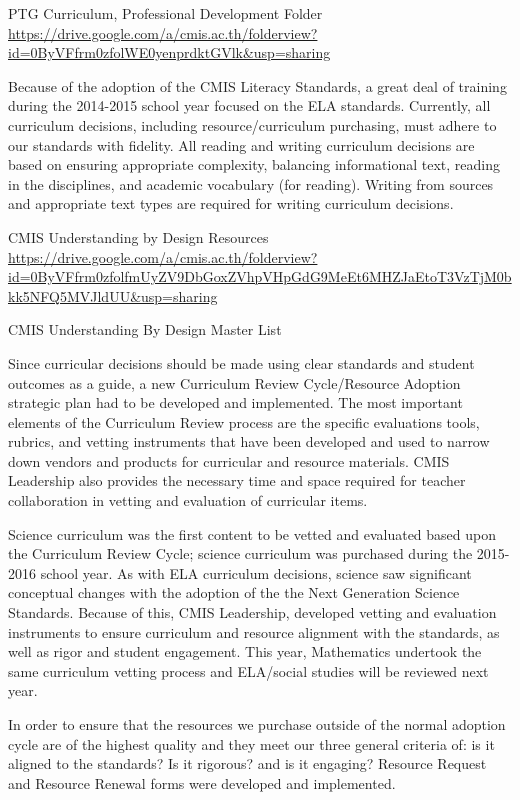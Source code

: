 \documentclass{report}
\begin{document}
\begin{evidence}
\item PTG Curriculum, Professional Development Folder \url{https://drive.google.com/a/cmis.ac.th/folderview?id=0ByVFfrm0zfolWE0yenprdktGVlk&usp=sharing}
\end{evidence}

\begin{findings}
Because of the adoption of the CMIS Literacy Standards, a great deal of training during the 2014-2015 school year focused on the ELA standards. Currently, all curriculum decisions, including resource/curriculum purchasing, must adhere to our standards with fidelity. All reading and writing curriculum decisions are based on ensuring appropriate complexity, balancing informational text, reading in the disciplines, and academic vocabulary (for reading). Writing from sources and appropriate text types are required for writing curriculum decisions. 
\end{findings}

\begin{evidence}
\item CMIS Understanding by Design Resources \url{https://drive.google.com/a/cmis.ac.th/folderview?id=0ByVFfrm0zfolfmUyZV9DbGoxZVhpVHpGdG9MeEt6MHZJaEtoT3VzTjM0bkk5NFQ5MVJldUU&usp=sharing}
\item CMIS Understanding By Design Master List
\end{evidence}

\begin{findings}

Since curricular decisions should be made using clear standards and student outcomes as a guide, a new Curriculum Review Cycle/Resource Adoption strategic plan had to be developed and implemented. The most important elements of the Curriculum Review process are the specific evaluations tools, rubrics, and vetting instruments that have been developed and used to narrow down vendors and products for curricular and resource materials. CMIS Leadership also provides the necessary time and space required for teacher collaboration in vetting and evaluation of curricular items. 

Science curriculum was the first content to be vetted and evaluated based upon the Curriculum Review Cycle; science curriculum was purchased during the 2015-2016 school year. As with ELA curriculum decisions, science saw significant conceptual changes with the adoption of the the Next Generation Science Standards. Because of this, CMIS Leadership, developed vetting and evaluation instruments to ensure curriculum and resource alignment with the standards, as well as rigor and student engagement. This year, Mathematics undertook the same curriculum vetting process and ELA/social studies will be reviewed next year. 

In order to ensure that the resources we purchase outside of the normal adoption cycle are of the highest quality and they meet our three general criteria of: is it aligned to the standards? Is it rigorous? and is it engaging? Resource Request and Resource Renewal forms were developed and implemented. 
\end{findings}
\end{document}
